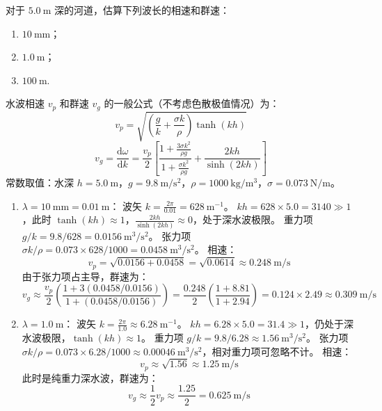 \begin{exercise}\label{ex:8.10}
对于 $5.0 \ \mathrm{m}$ 深的河道，估算下列波长的相速和群速：
\begin{enumerate}
  \item[(a)] $10 \ \mathrm{mm}$；
  \item[(b)] $1.0 \ \mathrm{m}$；
  \item[(c)] $100 \ \mathrm{m}$.
\end{enumerate}
\end{exercise}
\begin{solution}
水波相速 $v_p$ 和群速 $v_g$ 的一般公式（不考虑色散极值情况）为：
$$ v_p = \sqrt{ \left( \frac{g}{k} + \frac{\sigma k}{\rho} \right) \tanh(kh) } $$
$$ v_g = \frac{\mathrm{d}\omega}{\mathrm{d}k} = \frac{v_p}{2} \left[ \frac{1 + \frac{3\sigma k^2}{\rho g}}{1 + \frac{\sigma k^2}{\rho g}} + \frac{2kh}{\sinh(2kh)} \right] $$
常数取值：水深 $h = 5.0 \ \mathrm{m}$，$g = 9.8 \ \mathrm{m/s^2}$，$\rho = 1000 \ \mathrm{kg/m^3}$，$\sigma = 0.073 \ \mathrm{N/m}$。

\begin{enumerate}
    \item[(a)] \textbf{$\lambda = 10 \ \mathrm{mm} = 0.01 \ \mathrm{m}$}：
    波矢 $k = \frac{2\pi}{0.01} = 628 \ \mathrm{m^{-1}}$。
    $kh = 628 \times 5.0 = 3140 \gg 1$，此时 $\tanh(kh) \approx 1$，$\frac{2kh}{\sinh(2kh)} \approx 0$，处于深水波极限。
    重力项 $g/k = 9.8 / 628 = 0.0156 \ \mathrm{m^3/s^2}$。
    张力项 $\sigma k/\rho = 0.073 \times 628 / 1000 = 0.0458 \ \mathrm{m^3/s^2}$。
    相速：
    $$ v_p = \sqrt{0.0156 + 0.0458} = \sqrt{0.0614} \approx 0.248 \ \mathrm{m/s} $$
    由于张力项占主导，群速为：
    $$ v_g \approx \frac{v_p}{2} \left( \frac{1 + 3(0.0458/0.0156)}{1 + (0.0458/0.0156)} \right) = \frac{0.248}{2} \left( \frac{1 + 8.81}{1 + 2.94} \right) = 0.124 \times 2.49 \approx 0.309 \ \mathrm{m/s} $$

    \item[(b)] \textbf{$\lambda = 1.0 \ \mathrm{m}$}：
    波矢 $k = \frac{2\pi}{1.0} \approx 6.28 \ \mathrm{m^{-1}}$。
    $kh = 6.28 \times 5.0 = 31.4 \gg 1$，仍处于深水波极限，$\tanh(kh) \approx 1$。
    重力项 $g/k = 9.8 / 6.28 \approx 1.56 \ \mathrm{m^3/s^2}$。
    张力项 $\sigma k/\rho = 0.073 \times 6.28 / 1000 \approx 0.00046 \ \mathrm{m^3/s^2}$，相对重力项可忽略不计。
    相速：
    $$ v_p \approx \sqrt{1.56} \approx 1.25 \ \mathrm{m/s} $$
    此时是纯重力深水波，群速为：
    $$ v_g \approx \frac{1}{2} v_p \approx \frac{1.25}{2} = 0.625 \ \mathrm{m/s} $$


\end{enumerate}
\end{solution}
